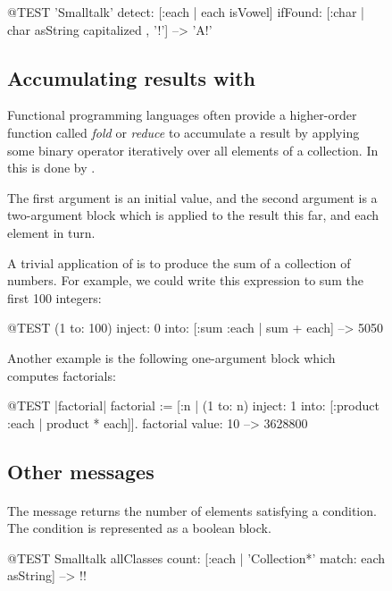 \documentclass[a4paper,10pt,twoside]{book}
\begin{document}
\begin{figure}
\begin{center}
\begin{code}{@TEST}
'Smalltalk' detect: [:each | each isVowel] ifFound: [:char | char asString capitalized , '!'] --> 'A!'
\end{code}

\subsection{Accumulating results with }
Functional programming languages often provide a higher-order function called \emph{fold} or \emph{reduce} to accumulate a result by applying some binary operator iteratively over all elements of a collection.
In \sq this is done by .

The first argument is an initial value, and the second argument is a two-argument block which is applied to the result this far, and each element in turn.

A trivial application of  is to produce the sum of a collection of numbers.
For example, we could write this expression to sum the first 100 integers:
\begin{code}{@TEST}
(1 to: 100) inject: 0 into: [:sum :each | sum + each] --> 5050
\end{code}

Another example is the following one-argument block which computes factorials:
\begin{code}{@TEST |factorial|}
factorial := [:n | (1 to: n) inject: 1 into: [:product :each | product * each]].
factorial value: 10 --> 3628800
\end{code}

\subsection{Other messages}

\paragraph{}
The message  returns the number of elements satisfying a condition.
The condition is represented as a boolean block.

\begin{code}{@TEST}
Smalltalk allClasses count: [:each | 'Collection*' match: each asString] --> !!
\end{code}


\end{center}
\end{figure}
\end{document}
